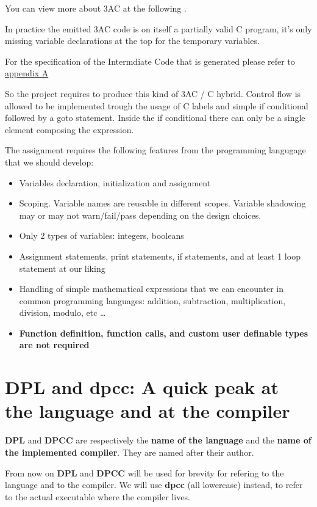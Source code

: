 \documentclass[a4paper]{article}
\newcommand{\urlref}[3][blue]{\href{#2}{\color{#1}{#3}}}%
\begin{document}
You can view more about 3AC at the following \urlref{https://en.wikipedia.org/wiki/Three-address_code}{Wikipedia link}.

In practice the emitted 3AC code is on itself a partially valid C program, it's only missing variable
declarations at the top for the temporary variables.


For the specification of the Intermdiate Code that is generated please refer to \hyperref[appendix_a]{appendix A}

So the project requires to produce this kind of 3AC / C hybrid. Control flow is allowed to be implemented
trough the usage of C labels and simple if conditional followed by a goto statement. Inside
the if conditional there can only be a single element composing the expression.

The assignment requires the following features from the programming langugage that we should develop:

\begin{itemize}
    \item Variables declaration, initialization and assignment
    \item Scoping. Variable names are reusable in different scopes. Variable
        shadowing may or may not warn/fail/pass depending on the design choices.
    \item Only 2 types of variables: integers, booleans
    \item Assignment statements, print statements, if statements, and at least 1 loop statement at our liking
    \item Handling of simple mathematical expressions that we can encounter in common programming
        languages: addition, subtraction, multiplication, division, modulo, etc \dots
    \item \textbf{Function definition, function calls, and custom user definable types are not required}
\end{itemize}

\clearpage

\section{DPL and dpcc: A quick peak at the language and at the compiler}

\textbf{DPL} and \textbf{DPCC} are respectively the \textbf{name of the language} and the
\textbf{name of the implemented compiler}. They are named after their author.

From now on \textbf{DPL} and \textbf{DPCC} will be used for brevity for refering to the language and to the compiler.
We will use \textbf{dpcc} (all lowercase) instead, to refer to the actual executable where the compiler lives.
\end{document}
